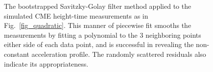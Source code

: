 \documentclass[structabstract]{aa}
\begin{document}
\begin{figure}[t]
\centering
{}
\caption{The bootstrapped Savitzky-Golay filter method applied to the simulated CME height-time measurements as in Fig.~\ref{fig_quadratic}. This manner of piecewise fit smooths the measurements by fitting a polynomial to the 3 neighboring points either side of each data point, and is successful in revealing the non-constant acceleration profile. The randomly scattered residuals also indicate its appropriateness.}
\label{fig_savgol}
\end{figure}
\end{document}
